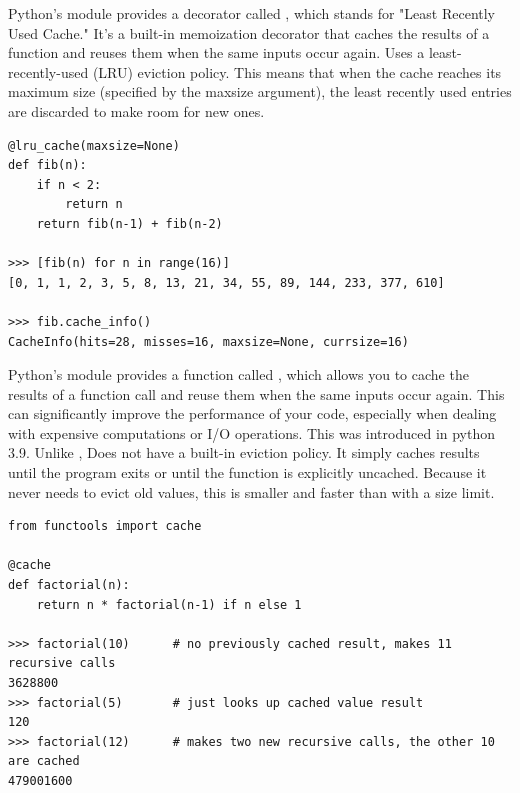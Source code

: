 Python's  module provides a decorator called , which stands for "Least Recently Used Cache." It's a built-in memoization decorator that caches the results of a function and reuses them when the same inputs occur again.  Uses a least-recently-used (LRU) eviction policy. This means that when the cache reaches its maximum size (specified by the maxsize argument), the least recently used entries are discarded to make room for new ones.
\begin{lstlisting}
@lru_cache(maxsize=None)
def fib(n):
    if n < 2:
        return n
    return fib(n-1) + fib(n-2)

>>> [fib(n) for n in range(16)]
[0, 1, 1, 2, 3, 5, 8, 13, 21, 34, 55, 89, 144, 233, 377, 610]

>>> fib.cache_info()
CacheInfo(hits=28, misses=16, maxsize=None, currsize=16)
\end{lstlisting}

Python's  module provides a function called , which allows you to cache the results of a function call and reuse them when the same inputs occur again. This can significantly improve the performance of your code, especially when dealing with expensive computations or I/O operations. This was introduced in python 3.9. Unlike ,  Does not have a built-in eviction policy. It simply caches results until the program exits or until the function is explicitly uncached. Because it never needs to evict old values, this is smaller and faster than  with a size limit.

\begin{lstlisting}
from functools import cache

@cache
def factorial(n):
    return n * factorial(n-1) if n else 1

>>> factorial(10)      # no previously cached result, makes 11 recursive calls
3628800
>>> factorial(5)       # just looks up cached value result
120
>>> factorial(12)      # makes two new recursive calls, the other 10 are cached
479001600
\end{lstlisting}





\subsubsection{}

